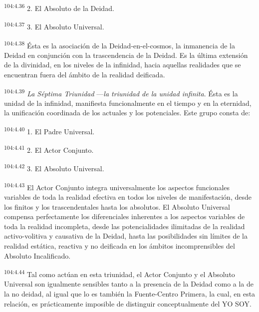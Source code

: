\documentclass[twoside, 11pt]{book}
\begin{document}
\par
\textsuperscript{104:4.36} 2. El Absoluto de la Deidad.

\par
\textsuperscript{104:4.37} 3. El Absoluto Universal.

\par
\textsuperscript{104:4.38} Ésta es la asociación de la Deidad-en-el-cosmos, la inmanencia de la Deidad en conjunción con la trascendencia de la Deidad. Es la última extensión de la divinidad, en los niveles de la infinidad, hacia aquellas realidades que se encuentran fuera del ámbito de la realidad deificada.

\par
\textsuperscript{104:4.39} \textit{La Séptima Triunidad} ---\textit{la triunidad de la unidad infinita}. Ésta es la unidad de la infinidad, manifiesta funcionalmente en el tiempo y en la eternidad, la unificación coordinada de los actuales y los potenciales. Este grupo consta de:

\par
\textsuperscript{104:4.40} 1. El Padre Universal.

\par
\textsuperscript{104:4.41} 2. El Actor Conjunto.

\par
\textsuperscript{104:4.42} 3. El Absoluto Universal.

\par
\textsuperscript{104:4.43} El Actor Conjunto integra universalmente los aspectos funcionales variables de toda la realidad efectiva en todos los niveles de manifestación, desde los finitos y los trascendentales hasta los absolutos. El Absoluto Universal compensa perfectamente los diferenciales inherentes a los aspectos variables de toda la realidad incompleta, desde las potencialidades ilimitadas de la realidad activo-volitiva y causativa de la Deidad, hasta las posibilidades sin límites de la realidad estática, reactiva y no deificada en los ámbitos incomprensibles del Absoluto Incalificado.

\par
\textsuperscript{104:4.44} Tal como actúan en esta triunidad, el Actor Conjunto y el Absoluto Universal son igualmente sensibles tanto a la presencia de la Deidad como a la de la no deidad, al igual que lo es también la Fuente-Centro Primera, la cual, en esta relación, es prácticamente imposible de distinguir conceptualmente del YO SOY.
\end{document}
